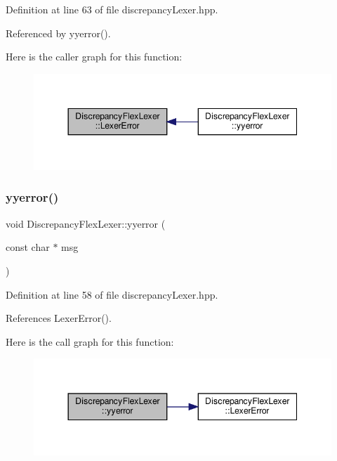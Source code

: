 Definition at line 63 of file discrepancy\+Lexer.\+hpp.



Referenced by yyerror().

Here is the caller graph for this function\+:
\nopagebreak
\begin{figure}[H]
\begin{center}
\leavevmode
\includegraphics[width=344pt]{d4/d94/structDiscrepancyFlexLexer_a82526ebd7cb2e0e9d564a850e025b80d_icgraph}
\end{center}
\end{figure}
\mbox{\label{structDiscrepancyFlexLexer_a4ae4826544bd976fb06dd16cfd007561}} 
\subsubsection{\texorpdfstring{yyerror()}{yyerror()}}
{\footnotesize\ttfamily void Discrepancy\+Flex\+Lexer\+::yyerror (\begin{DoxyParamCaption}\item[{const char $\ast$}]{msg }\end{DoxyParamCaption})\hspace{0.3cm}{\ttfamily [inline]}}



Definition at line 58 of file discrepancy\+Lexer.\+hpp.



References Lexer\+Error().

Here is the call graph for this function\+:
\nopagebreak
\begin{figure}[H]
\begin{center}
\leavevmode
\includegraphics[width=344pt]{d4/d94/structDiscrepancyFlexLexer_a4ae4826544bd976fb06dd16cfd007561_cgraph}
\end{center}
\end{figure}
\mbox{\label{structDiscrepancyFlexLexer_a34f5dc468e146d391709f96c0b43e0a7}} 
